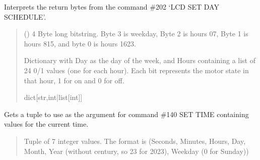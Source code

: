 \documentclass[letterpaper,10pt,english]{sphinxmanual}
\begin{document}
\begin{fulllineitems}
\begin{fulllineitems}
\label{\detokenize{PodDevice_8229:PodDevice_8229.POD_8229.DecodeLCDSchedule}}
\pysigstartsignatures
{}
\pysigstopsignatures
\sphinxAtStartPar
Interprets the return bytes from the command \#202 ‘LCD SET DAY SCHEDULE’.
\begin{quote}\begin{description}
\sphinxAtStartPar
{} () \textendash{} 4 Byte long bitstring. Byte 3 is weekday, Byte 2 is hours 0\sphinxhyphen{}7,                 Byte 1 is hours 8\sphinxhyphen{}15, and byte 0 is hours 16\sphinxhyphen{}23.

\sphinxAtStartPar
Dictionary with Day as the day of the week, and Hours                 containing a list of 24 0/1 values (one for each hour). Each bit represents the                 motor state in that hour, 1 for on and 0 for off.

\sphinxAtStartPar
dict{[}str,int|list{[}int{]}{]}

\end{description}\end{quote}

\end{fulllineitems}


\begin{fulllineitems}
\label{\detokenize{PodDevice_8229:PodDevice_8229.POD_8229.GetCurrentTime}}
\pysigstartsignatures
{}
\pysigstopsignatures
\sphinxAtStartPar
Gets a tuple to use as the argument for command \#140 SET TIME containing values for the current time.
\begin{quote}\begin{description}
\sphinxAtStartPar
Tuple of 7 integer values. The format is (Seconds, Minutes, Hours, Day, Month, Year                 (without century, so 23 for 2023), Weekday (0 for Sunday))


\end{description}
\end{quote}
\end{fulllineitems}
\end{fulllineitems}
\end{document}
